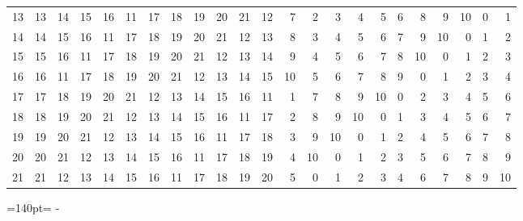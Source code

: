 \documentclass[10pt,a4paper]{article}
\newcommand{\needspace}[1]{\par\penalty-100\begingroup\dimen0=#1\relax\dimen2=\pagegoal
  \advance\dimen2-\pagetotal\ifdim\dimen0>\dimen2\relax\ifdim\dimen2>0pt\vfil\break\fi\fi
  \endgroup}
\numberwithin{equation}{section}
\begin{document}
{\begin{longtable}{@{}r|rrrrrrrrrrrrrrrrrrrrrr@{}}
13 & 13 & 14 & 15 & 16 & 11 & 17 & 18 & 19 & 20 & 21 & 12 & 7 & 2 & 3 & 4 & 5 & 6 & 8 & 9 & 10 & 0 & 1\\
14 & 14 & 15 & 16 & 11 & 17 & 18 & 19 & 20 & 21 & 12 & 13 & 8 & 3 & 4 & 5 & 6 & 7 & 9 & 10 & 0 & 1 & 2\\
15 & 15 & 16 & 11 & 17 & 18 & 19 & 20 & 21 & 12 & 13 & 14 & 9 & 4 & 5 & 6 & 7 & 8 & 10 & 0 & 1 & 2 & 3\\
16 & 16 & 11 & 17 & 18 & 19 & 20 & 21 & 12 & 13 & 14 & 15 & 10 & 5 & 6 & 7 & 8 & 9 & 0 & 1 & 2 & 3 & 4\\
17 & 17 & 18 & 19 & 20 & 21 & 12 & 13 & 14 & 15 & 16 & 11 & 1 & 7 & 8 & 9 & 10 & 0 & 2 & 3 & 4 & 5 & 6\\
18 & 18 & 19 & 20 & 21 & 12 & 13 & 14 & 15 & 16 & 11 & 17 & 2 & 8 & 9 & 10 & 0 & 1 & 3 & 4 & 5 & 6 & 7\\
19 & 19 & 20 & 21 & 12 & 13 & 14 & 15 & 16 & 11 & 17 & 18 & 3 & 9 & 10 & 0 & 1 & 2 & 4 & 5 & 6 & 7 & 8\\
20 & 20 & 21 & 12 & 13 & 14 & 15 & 16 & 11 & 17 & 18 & 19 & 4 & 10 & 0 & 1 & 2 & 3 & 5 & 6 & 7 & 8 & 9\\*
21 & 21 & 12 & 13 & 14 & 15 & 16 & 11 & 17 & 18 & 19 & 20 & 5 & 0 & 1 & 2 & 3 & 4 & 6 & 7 & 8 & 9 & 10\\
\bottomrule\end{longtable}}
\needspace{140pt}
\end{document}
